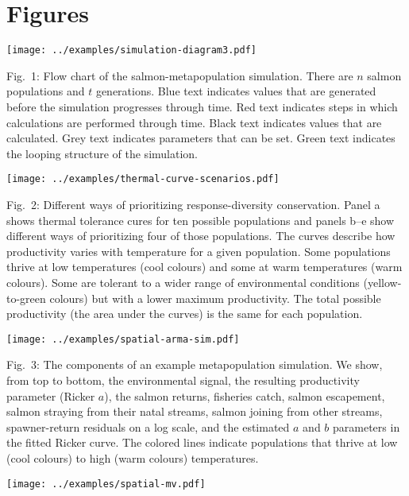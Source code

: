 



\clearpage

\section{Figures}

\setlength{\parskip}{6pt} \setlength{\parindent}{0cm} \clearpage
\texttt{[image: ../examples/simulation-diagram3.pdf]}

Fig.~1: Flow chart of the salmon-metapopulation simulation. There are $n$ salmon populations and $t$ generations. Blue text indicates values that are generated before the simulation progresses through time. Red text indicates steps in which calculations are performed through time. Black text indicates values that are calculated. Grey text indicates parameters that can be set. Green text indicates the looping structure of the simulation.

\clearpage
\texttt{[image: ../examples/thermal-curve-scenarios.pdf]}

Fig.~2: Different ways of prioritizing response-diversity conservation. Panel a shows thermal tolerance cures for ten possible populations and panels b--e show different ways of prioritizing four of those populations. The curves describe how productivity varies with temperature for a given population. Some populations thrive at low temperatures (cool colours) and some at warm temperatures (warm colours). Some are tolerant to a wider range of environmental conditions (yellow-to-green colours) but with a lower maximum productivity. The total possible productivity (the area under the curves) is the same for each population.

\clearpage
\texttt{[image: ../examples/spatial-arma-sim.pdf]}

Fig.~3: The components of an example metapopulation simulation. We show, from top to bottom, the environmental signal, the resulting productivity parameter (Ricker $a$), the salmon returns, fisheries catch, salmon escapement, salmon straying from their natal streams, salmon joining from other streams, spawner-return residuals on a log scale, and the estimated $a$ and $b$ parameters in the fitted Ricker curve. The colored lines indicate populations that thrive at low (cool colours) to high (warm colours) temperatures.

\clearpage
\texttt{[image: ../examples/spatial-mv.pdf]}

